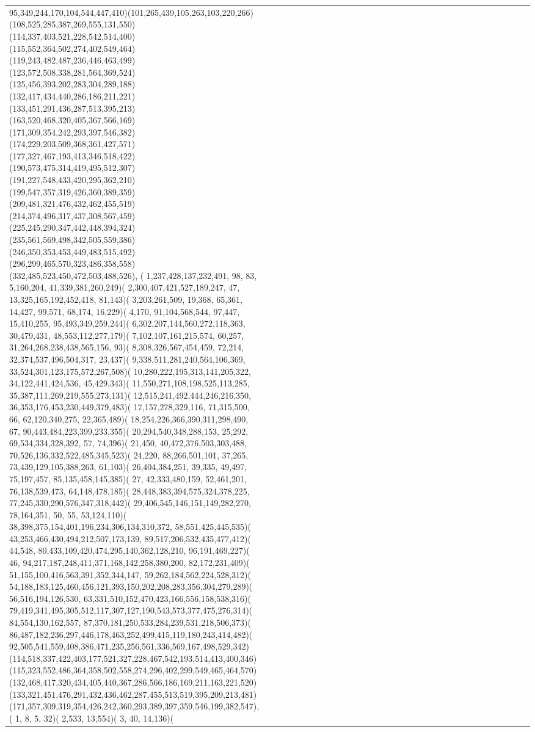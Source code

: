 \documentclass[varwidth=\maxdimen,border=10]{standalone}
\begin{document}
\begin{tabular}{@{}l@{}l@{}l@{}l@{}l@{}l@{}l@{}l@{}l@{}l@{}l@{}l@{}l@{}l@{}l@{}l@{}l@{}l@{}l@{}l@{}l@{}l@{}l@{}l@{}l@{}l@{}l@{}l@{}l@{}l@{}l@{}l@{}}
95,349,244,170,104,544,447,410)(101,265,439,105,263,103,220,266)(108,525,285,387,269,555,131,550)(114,337,403,521,228,542,514,400)(115,552,364,502,274,402,549,464)(119,243,482,487,236,446,463,499)(123,572,508,338,281,564,369,524)(125,456,393,202,283,304,289,188)(132,417,434,440,286,186,211,221)(133,451,291,436,287,513,395,213)(163,520,468,320,405,367,566,169)(171,309,354,242,293,397,546,382)(174,229,203,509,368,361,427,571)(177,327,467,193,413,346,518,422)(190,573,475,314,419,495,512,307)(191,227,548,433,420,295,362,210)(199,547,357,319,426,360,389,359)(209,481,321,476,432,462,455,519)(214,374,496,317,437,308,567,459)(225,245,290,347,442,448,394,324)(235,561,569,498,342,505,559,386)(246,350,353,453,449,483,515,492)(296,299,465,570,323,486,358,558)(332,485,523,450,472,503,488,526), (  1,237,428,137,232,491, 98, 83,  5,160,204, 41,339,381,260,249)(  2,300,407,421,527,189,247, 47, 13,325,165,192,452,418, 81,143)(  3,203,261,509, 19,368, 65,361, 14,427, 99,571, 68,174, 16,229)(  4,170, 91,104,568,544, 97,447, 15,410,255, 95,493,349,259,244)(  6,302,207,144,560,272,118,363, 30,479,431, 48,553,112,277,179)(  7,102,107,161,215,574, 60,257, 31,264,268,238,438,565,156, 93)(  8,308,326,567,454,459, 72,214, 32,374,537,496,504,317, 23,437)(  9,338,511,281,240,564,106,369, 33,524,301,123,175,572,267,508)( 10,280,222,195,313,141,205,322, 34,122,441,424,536, 45,429,343)( 11,550,271,108,198,525,113,285, 35,387,111,269,219,555,273,131)( 12,515,241,492,444,246,216,350, 36,353,176,453,230,449,379,483)( 17,157,278,329,116, 71,315,500, 66, 62,120,340,275, 22,365,489)( 18,254,226,366,390,311,298,490, 67, 90,443,484,223,399,233,355)( 20,294,540,348,288,153, 25,292, 69,534,334,328,392, 57, 74,396)( 21,450, 40,472,376,503,303,488, 70,526,136,332,522,485,345,523)( 24,220, 88,266,501,101, 37,265, 73,439,129,105,388,263, 61,103)( 26,404,384,251, 39,335, 49,497, 75,197,457, 85,135,458,145,385)( 27, 42,333,480,159, 52,461,201, 76,138,539,473, 64,148,478,185)( 28,448,383,394,575,324,378,225, 77,245,330,290,576,347,318,442)( 29,406,545,146,151,149,282,270, 78,164,351, 50, 55, 53,124,110)( 38,398,375,154,401,196,234,306,134,310,372, 58,551,425,445,535)( 43,253,466,430,494,212,507,173,139, 89,517,206,532,435,477,412)( 44,548, 80,433,109,420,474,295,140,362,128,210, 96,191,469,227)( 46, 94,217,187,248,411,371,168,142,258,380,200, 82,172,231,409)( 51,155,100,416,563,391,352,344,147, 59,262,184,562,224,528,312)( 54,188,183,125,460,456,121,393,150,202,208,283,356,304,279,289)( 56,516,194,126,530, 63,331,510,152,470,423,166,556,158,538,316)( 79,419,341,495,305,512,117,307,127,190,543,573,377,475,276,314)( 84,554,130,162,557, 87,370,181,250,533,284,239,531,218,506,373)( 86,487,182,236,297,446,178,463,252,499,415,119,180,243,414,482)( 92,505,541,559,408,386,471,235,256,561,336,569,167,498,529,342)(114,518,337,422,403,177,521,327,228,467,542,193,514,413,400,346)(115,323,552,486,364,358,502,558,274,296,402,299,549,465,464,570)(132,468,417,320,434,405,440,367,286,566,186,169,211,163,221,520)(133,321,451,476,291,432,436,462,287,455,513,519,395,209,213,481)(171,357,309,319,354,426,242,360,293,389,397,359,546,199,382,547), (  1,  8,  5, 32)(  2,533, 13,554)(  3, 40, 14,136)( 
\end{tabular}
\end{document}
